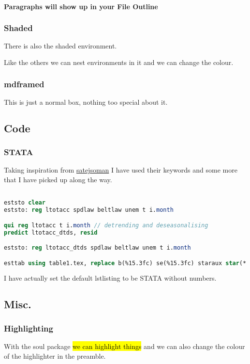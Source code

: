 \documentclass[11pt]{article}
\begin{document}
\paragraph{Paragraphs will show up in your File Outline} 

\subsubsection{Shaded}
\begin{shaded}
    There is also the shaded environment. \begin{note}
        Like the others we can nest environments in it and we can change the colour.
    \end{note}
\end{shaded}

\subsubsection{mdframed}
\begin{mdframed}
    This is just a normal box, nothing too special about it.
\end{mdframed}

\subsection{Code}
\subsubsection*{STATA}
Taking inspiration from \hyperlink{https://github.com/satejsoman/stata-lstlisting}{satejsoman} I have used their keywords and some more that I have picked up along the way.

\begin{lstlisting}[language = Stata, numbers = none, caption = Example of STATA with lstlisting]

eststo clear
eststo: reg ltotacc spdlaw beltlaw unem t i.month

qui reg ltotacc t i.month // detrending and deseasonalising
predict ltotacc_dtds, resid

eststo: reg ltotacc_dtds spdlaw beltlaw unem t i.month

esttab using table1.tex, replace b(%15.3fc) se(%15.3fc) staraux star(* 0.10 ** 0.05 *** 0.01) r2 booktabs  label
\end{lstlisting}

\begin{note}
    I have actually set the default lstlisting to be STATA without numbers.
\end{note}

\subsection{Misc.}
\subsubsection{Highlighting}
With the soul package \hl{we can highlight things} and we can also change the colour of the highlighter in the preamble.
\end{document}
